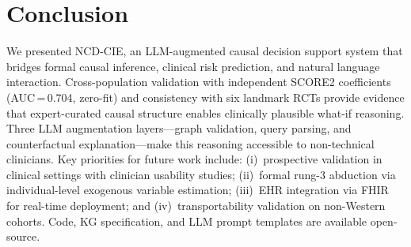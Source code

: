 \documentclass[runningheads]{llncs}
\begin{document}
\section{Conclusion}\label{sec:conclusion}

We presented NCD-CIE, an LLM-augmented causal decision support
system that bridges formal causal inference, clinical risk
prediction, and natural language interaction.
Cross-population validation with independent SCORE2 coefficients
(AUC\,=\,0.704, zero-fit) and consistency with six landmark RCTs
provide evidence that expert-curated causal structure enables
clinically plausible what-if reasoning.
Three LLM augmentation layers---graph validation, query parsing,
and counterfactual explanation---make this reasoning accessible
to non-technical clinicians.
Key priorities for future work include: (i)~prospective validation
in clinical settings with clinician usability studies;
(ii)~formal rung-3 abduction via individual-level exogenous
variable estimation; (iii)~EHR integration via FHIR for
real-time deployment; and (iv)~transportability validation on
non-Western cohorts.
Code, KG specification, and LLM prompt templates are available
open-source.
\end{document}
